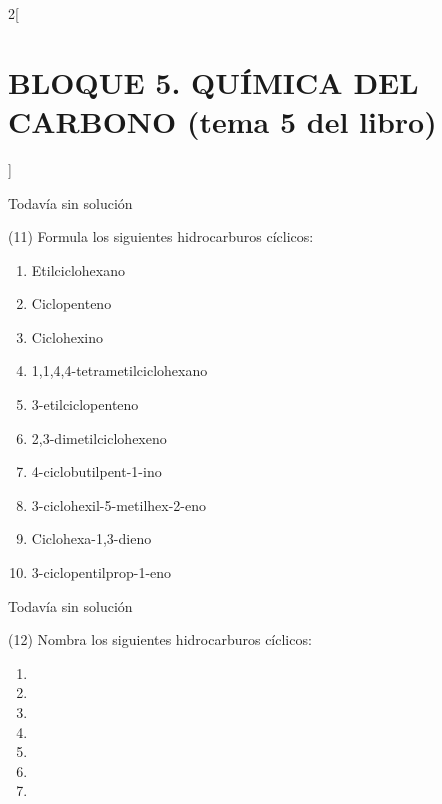 \documentclass[10pt]{article}
\begin{document}
\begin{multicols}{2}[
  \section{BLOQUE 5. QUÍMICA DEL CARBONO (tema 5 del libro)}
  ]
\begin{solution}[print=false]
  Todavía sin solución
\end{solution}




\begin{exercise}[
    tags    = {},
    topics  = {química, química orgánica, orgánica},
    source  = {FQ 1B MGH 2016, p131, e11},
  ]
  (11) Formula los siguientes hidrocarburos cíclicos:
  \begin{enumerate}
    \item Etilciclohexano
    \item Ciclopenteno
    \item Ciclohexino
    \item 1,1,4,4-tetrametilciclohexano
    \item 3-etilciclopenteno
    \item 2,3-dimetilciclohexeno
    \item 4-ciclobutilpent-1-ino
    \item 3-ciclohexil-5-metilhex-2-eno
    \item Ciclohexa-1,3-dieno
    \item 3-ciclopentilprop-1-eno
  \end{enumerate}
\end{exercise}

\begin{solution}[print=false]
  Todavía sin solución
\end{solution}




\begin{exercise}[
    tags    = {},
    topics  = {química, química orgánica, orgánica},
    source  = {FQ 1B MGH 2016, p131, e12},
  ]
  (12) Nombra los siguientes hidrocarburos cíclicos:
  \begin{enumerate}
    \item {}
    \item {}
    \item {}
    \item {}
    \item {}
    \item {}
    \item {}
  \end{enumerate}
\end{exercise}


\end{multicols}
\end{document}
